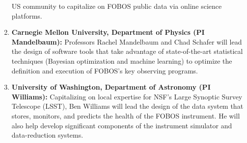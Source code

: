 \documentclass[oneside,11pt]{amsart}
\begin{document}
\begin{enumerate}
US community to capitalize on FOBOS public data via online science
platforms.
%
\item {\bf Carnegie Mellon University, Department of Physics (PI
Mandelbaum):} Professors Rachel Mandelbaum and Chad Schafer will lead
the design of software tools that take advantage of state-of-the-art
statistical techniques (Bayesian optimization and machine learning)
to optimize the definition and execution of FOBOS's key observing
programs.
%
\item {\bf University of Washington, Department of Astronomy (PI
Williams):} Capitalizing on local expertise for NSF's Large Synoptic
Survey Telescope (LSST), Ben Williams will lead the design of the
data system that stores, monitors, and predicts the health of the
FOBOS instrument. He will also help develop significant components of
the instrument simulator and data-reduction systems.
%
\end{enumerate}
\end{document}
